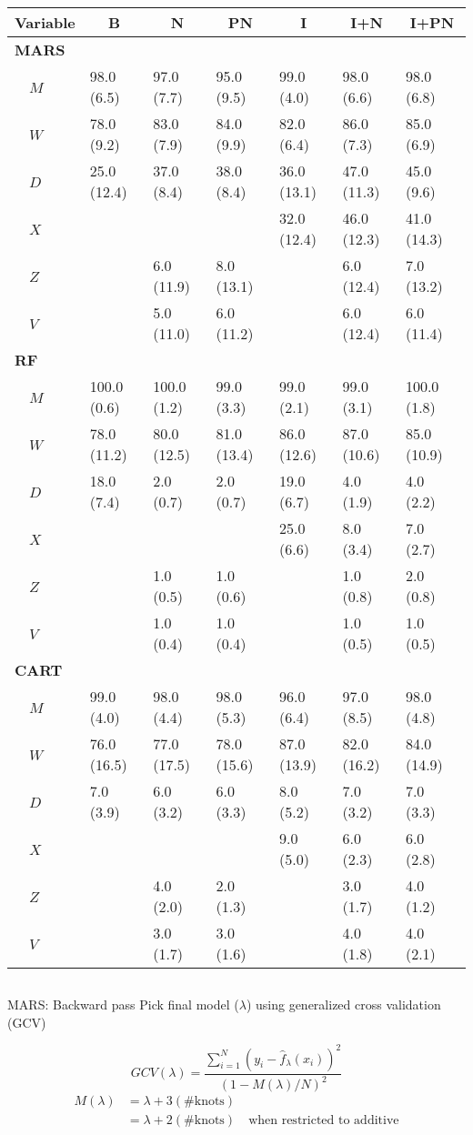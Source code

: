 \documentclass[handout]{beamer}
\begin{document}
\begin{frame}[c]{}
  \begin{columns}
    \column{\dimexpr\paperwidth}
\begin{table}
\scriptsize
\centering
\begin{tabular}{lllllll}
\toprule
\multicolumn{1}{l}{Variable}&\multicolumn{1}{c}{B}&\multicolumn{1}{c}{N}&\multicolumn{1}{c}{PN}&\multicolumn{1}{c}{I}&\multicolumn{1}{c}{I+N}&\multicolumn{1}{c}{I+PN}\tabularnewline
\midrule
{\bfseries MARS}&&&&&&\tabularnewline
~~$M$&98.0 (6.5)&97.0 (7.7)&95.0 (9.5)&99.0 (4.0)&98.0 (6.6)&98.0 (6.8)\tabularnewline
~~$W$&78.0 (9.2)&83.0 (7.9)&84.0 (9.9)&82.0 (6.4)&86.0 (7.3)&85.0 (6.9)\tabularnewline
~~$D$&25.0 (12.4)&37.0 (8.4)&38.0 (8.4)&36.0 (13.1)&47.0 (11.3)&45.0 (9.6)\tabularnewline
~~$X$&&&&32.0 (12.4)&46.0 (12.3)&41.0 (14.3)\tabularnewline
~~$Z$&&6.0 (11.9)&8.0 (13.1)&&6.0 (12.4)&7.0 (13.2)\tabularnewline
~~$V$&&5.0 (11.0)&6.0 (11.2)&&6.0 (12.4)&6.0 (11.4)\tabularnewline
\midrule
{\bfseries RF}&&&&&&\tabularnewline
~~$M$&100.0 (0.6)&100.0 (1.2)&99.0 (3.3)&99.0 (2.1)&99.0 (3.1)&100.0 (1.8)\tabularnewline
~~$W$&78.0 (11.2)&80.0 (12.5)&81.0 (13.4)&86.0 (12.6)&87.0 (10.6)&85.0 (10.9)\tabularnewline
~~$D$&18.0 (7.4)&2.0 (0.7)&2.0 (0.7)&19.0 (6.7)&4.0 (1.9)&4.0 (2.2)\tabularnewline
~~$X$&&&&25.0 (6.6)&8.0 (3.4)&7.0 (2.7)\tabularnewline
~~$Z$&&1.0 (0.5)&1.0 (0.6)&&1.0 (0.8)&2.0 (0.8)\tabularnewline
~~$V$&&1.0 (0.4)&1.0 (0.4)&&1.0 (0.5)&1.0 (0.5)\tabularnewline
\midrule
{\bfseries CART}&&&&&&\tabularnewline
~~$M$&99.0 (4.0)&98.0 (4.4)&98.0 (5.3)&96.0 (6.4)&97.0 (8.5)&98.0 (4.8)\tabularnewline
~~$W$&76.0 (16.5)&77.0 (17.5)&78.0 (15.6)&87.0 (13.9)&82.0 (16.2)&84.0 (14.9)\tabularnewline
~~$D$&7.0 (3.9)&6.0 (3.2)&6.0 (3.3)&8.0 (5.2)&7.0 (3.2)&7.0 (3.3)\tabularnewline
~~$X$&&&&9.0 (5.0)&6.0 (2.3)&6.0 (2.8)\tabularnewline
~~$Z$&&4.0 (2.0)&2.0 (1.3)&&3.0 (1.7)&4.0 (1.2)\tabularnewline
~~$V$&&3.0 (1.7)&3.0 (1.6)&&4.0 (1.8)&4.0 (2.1)\tabularnewline
\bottomrule
\end{tabular}
\end{table}
  \end{columns}
\end{frame}

\begin{frame}{MARS: Backward pass}
Pick final model ($\lambda$) using generalized cross validation (GCV) 
    
    
    \begin{equation*}
    GCV(\lambda) =
      \frac{
        \sum_{i = 1}^{N}(y_{i} - \hat{f}_{\lambda}(x_{i}))^2
      }{
        (1 - M(\lambda)/N)^2
      }
  \end{equation*}
  \begin{align*}
    M(\lambda) &= \lambda + 3(\text{\# knots}) \\
     &=\lambda + 2(\text{\# knots}) \quad \text{when restricted to additive}
  \end{align*}
\end{frame}
\end{document}
